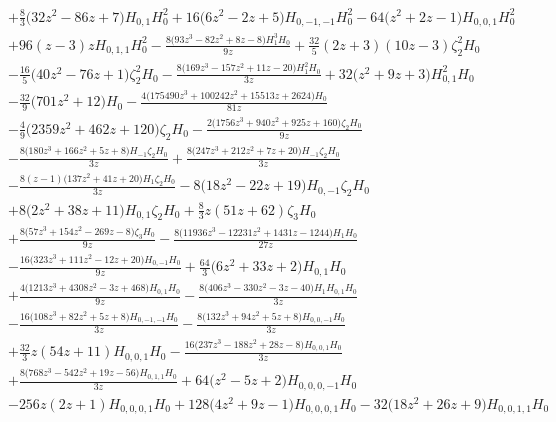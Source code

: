 \begin{eqnarray}
\nonumber \\ &&
+\frac{8}{3} \big(32 z^2-86 z+7\big) H_{0,1} H_0^2+16 \big(6 z^2-2z+5\big) H_{0,-1,-1} H_0^2-64 \big(z^2+2 z-1\big) H_{0,0,1} H_0^2
\nonumber \\ &&
+96 (z-3) z H_{0,1,1} H_0^2-\frac{8 \big(93 z^3-82 z^2+8 z-8\big) H_1^3 H_0}{9  z}+\frac{32}{5} (2 z+3) (10 z-3) \zeta_2^2 H_0
\nonumber \\ &&
-\frac{16}{5} \big(40 z^2-76 z+1\big) \zeta_2^2 H_0-\frac{8 \big(169 z^3-157 z^2+11  z-20\big) H_1^2 H_0}{3 z}+32 \big(z^2+9 z+3\big) H_{0,1}^2 H_0
\nonumber \\ &&
-\frac{32}{9} \big(701 z^2+12\big) H_0-\frac{4 \big(175490 z^3+100242 z^2+15513  z+2624\big) H_0}{81 z}
\nonumber \\ &&
-\frac{4}{9}  \big(2359 z^2+462 z+120\big)\zeta_2 H_0-\frac{2 \big(1756 z^3+940 z^2+925 z+160\big) \zeta_2  H_0}{9 z}
\nonumber \\ &&
-\frac{8 \big(180 z^3+166 z^2+5 z+8\big) H_{-1} \zeta_2 H_0}{3  z}+\frac{8  \big(247 z^3+212 z^2+7 z+20\big) H_{-1} \zeta_2  H_0}{3 z}
\nonumber \\ &&
-\frac{8 (z-1) \big(137 z^2+41 z+20\big) H_1 \zeta_2 H_0}{3  z}-8  \big(18 z^2-22 z+19\big) H_{0,-1} \zeta_2 H_0
\nonumber \\ &&
+8 \big(2z^2+38 z+11\big) H_{0,1} \zeta_2 H_0+\frac{8}{3}  z (51 z+62)\zeta_3 H_0
\nonumber \\ &&
+\frac{8 \big(57 z^3+154 z^2-269 z-8\big) \zeta_3 H_0}{9  z}-\frac{8 \big(11936 z^3-12231 z^2+1431 z-1244\big) H_1 H_0}{27 z}
\nonumber \\ &&
-\frac{16  \big(323 z^3+111 z^2-12 z+20\big) H_{0,-1} H_0}{9 z}+\frac{64}{3} \big(6 z^2+33 z+2\big) H_{0,1} H_0
\nonumber \\ &&
+\frac{4 \big(1213 z^3+4308 z^2-3 z+468\big)  H_{0,1} H_0}{9 z}-\frac{8 \big(406 z^3-330 z^2-3 z-40\big) H_1 H_{0,1}  H_0}{3 z}
\nonumber \\ &&
-\frac{16 \big(108 z^3+82 z^2+5 z+8\big) H_{0,-1,-1} H_0}{3  z}-\frac{8 \big(132 z^3+94 z^2+5 z+8\big) H_{0,0,-1} H_0}{3 z}
\nonumber \\ &&
+\frac{32}{3} z (54 z+11) H_{0,0,1} H_0-\frac{16 \big(237 z^3-188 z^2+28 z-8\big)  H_{0,0,1} H_0}{3 z}
\nonumber \\ &&
+\frac{8 \big(768 z^3-542 z^2+19 z-56\big) H_{0,1,1}  H_0}{3 z}+64 \big(z^2-5 z+2\big) H_{0,0,0,-1} H_0
\nonumber \\ &&
-256  z (2 z+1)H_{0,0,0,1} H_0
+128 \big(4 z^2+9 z-1\big) H_{0,0,0,1} H_0-32 \big(18 z^2+26z+9\big) H_{0,0,1,1} H_0

\end{eqnarray}
